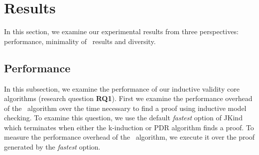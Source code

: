\section{Results}

\newcommand{\takeaway}[1]{
\vspace{6pt}
\noindent\fbox{\parbox{\columnwidth}{#1}}
\vspace{6pt}
}

In this section, we examine our experimental results from three perspectives: performance, minimality of \ucalg\ results and diversity.

\subsection{Performance}
\label{sec:performance}

In this subsection, we examine the performance of our inductive validity core algorithms (research question \textbf{RQ1}).  First we examine the performance overhead of the \ucalg\ algorithm over the time necessary to find a proof using inductive model checking.  To examine this question, we use the default {\em fastest} option of JKind which terminates when either the k-induction or PDR algorithm finds a proof.  To measure the performance overhead of the \ucalg\ algorithm, we execute it over the proof generated by the {\em fastest} option.

